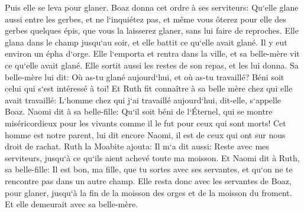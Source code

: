 \verse Puis elle se leva pour glaner. Boaz donna cet ordre à ses serviteurs: Qu`elle glane aussi entre les gerbes, et ne l`inquiétez pas, 
\verse et même vous ôterez pour elle des gerbes quelques épis, que vous la laisserez glaner, sans lui faire de reproches. 
\verse Elle glana dans le champ jusqu`au soir, et elle battit ce qu`elle avait glané. Il y eut environ un épha d`orge. 
\verse Elle l`emporta et rentra dans la ville, et sa belle-mère vit ce qu`elle avait glané. Elle sortit aussi les restes de son repas, et les lui donna. 
\verse Sa belle-mère lui dit: Où as-tu glané aujourd`hui, et où as-tu travaillé? Béni soit celui qui s`est intéressé à toi! Et Ruth fit connaître à sa belle mère chez qui elle avait travaillé: L`homme chez qui j`ai travaillé aujourd`hui, dit-elle, s`appelle Boaz. 
\verse Naomi dit à sa belle-fille: Qu`il soit béni de l`Éternel, qui se montre miséricordieux pour les vivants comme il le fut pour ceux qui sont morts! Cet homme est notre parent, lui dit encore Naomi, il est de ceux qui ont sur nous droit de rachat. 
\verse Ruth la Moabite ajouta: Il m`a dit aussi: Reste avec mes serviteurs, jusqu`à ce qu`ils aient achevé toute ma moisson. 
\verse Et Naomi dit à Ruth, sa belle-fille: Il est bon, ma fille, que tu sortes avec ses servantes, et qu`on ne te rencontre pas dans un autre champ. 
\verse Elle resta donc avec les servantes de Boaz, pour glaner, jusqu`à la fin de la moisson des orges et de la moisson du froment. Et elle demeurait avec sa belle-mère. 

